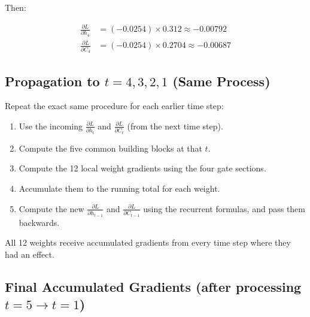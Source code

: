 \documentclass[12pt]{article}
\begin{document}
Then:

\begin{align*}
\frac{\partial L}{\partial h_4} &= (-0.0254) \times 0.312 \approx -0.00792 \\
\frac{\partial L}{\partial C_4} &= (-0.0254) \times 0.2704 \approx -0.00687
\end{align*}

\subsection*{Propagation to $t = 4, 3, 2, 1$ (Same Process)}

Repeat the exact same procedure for each earlier time step:

\begin{enumerate}
    \item Use the incoming $\frac{\partial L}{\partial h_t}$ and $\frac{\partial L}{\partial C_t}$ (from the next time step).
    \item Compute the five common building blocks at that $t$.
    \item Compute the 12 local weight gradients using the four gate sections.
    \item Accumulate them to the running total for each weight.
    \item Compute the new $\frac{\partial L}{\partial h_{t-1}}$ and $\frac{\partial L}{\partial C_{t-1}}$ using the recurrent formulas, and pass them backwards.
\end{enumerate}

All 12 weights receive accumulated gradients from every time step where they had an effect.

\subsection*{Final Accumulated Gradients (after processing $t=5 \to t=1$)}
\end{document}
